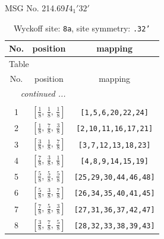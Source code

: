 \documentclass[fleqn,8pt]{jsarticle}
\begin{document}
\setcounter{MaxMatrixCols}{32}

\renewcommand{\tablename}{Table~}
\renewcommand{\figurename}{Figure~}
\begin{center}
\LARGE
MSG No. 214.69\quad$I4_{1}'32'$
\end{center}
\renewcommand{\arraystretch}{1.2}
\begin{longtable}{ccc}
\caption{Wyckoff site: {\tt 8a}, site symmetry: {\tt .32'}}
 \\
 \hline \hline
No. & position & mapping \\ \hline \endfirsthead

\multicolumn{2}{l}{\tablename\ \thetable{}} \\
 \hline \hline
No. & position & mapping \\ \hline \endhead

 \hline \hline
\multicolumn{2}{r}{\footnotesize\it continued ...} \\ \endfoot

 \hline \hline
\multicolumn{2}{r}{} \\ \endlastfoot

1 & $\left[ \frac{1}{8},\, \frac{1}{8},\, \frac{1}{8} \right]$ & {\tt [1,5,6,20,22,24]} \\ \hline
2 & $\left[ \frac{1}{8},\, \frac{7}{8},\, \frac{3}{8} \right]$ & {\tt [2,10,11,16,17,21]} \\ \hline
3 & $\left[ \frac{3}{8},\, \frac{1}{8},\, \frac{7}{8} \right]$ & {\tt [3,7,12,13,18,23]} \\ \hline
4 & $\left[ \frac{7}{8},\, \frac{3}{8},\, \frac{1}{8} \right]$ & {\tt [4,8,9,14,15,19]} \\ \hline
5 & $\left[ \frac{5}{8},\, \frac{5}{8},\, \frac{5}{8} \right]$ & {\tt [25,29,30,44,46,48]} \\ \hline
6 & $\left[ \frac{5}{8},\, \frac{3}{8},\, \frac{7}{8} \right]$ & {\tt [26,34,35,40,41,45]} \\ \hline
7 & $\left[ \frac{7}{8},\, \frac{5}{8},\, \frac{3}{8} \right]$ & {\tt [27,31,36,37,42,47]} \\ \hline
8 & $\left[ \frac{3}{8},\, \frac{7}{8},\, \frac{5}{8} \right]$ & {\tt [28,32,33,38,39,43]} \\
\end{longtable}
\renewcommand{\arraystretch}{1.2}
\end{document}
